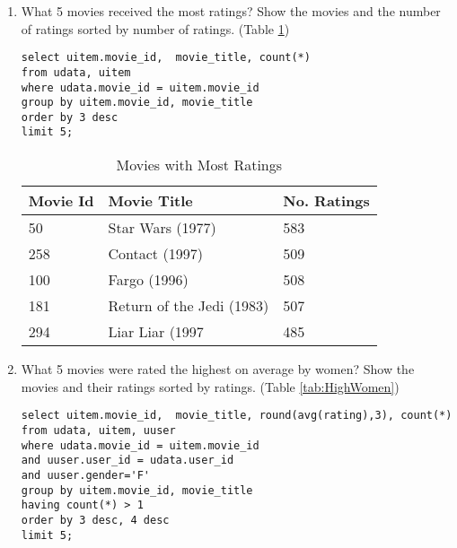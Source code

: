 \documentclass[letterpaper,11pt]{report}
\begin{document}
\begin{savenotes}
\begin{enumerate}
\item What 5 movies received the most ratings? Show the movies and the number of ratings sorted by number of ratings. (Table \ref{tab:MostRatings})

\begin{verbatim}
select uitem.movie_id,  movie_title, count(*) 
from udata, uitem 
where udata.movie_id = uitem.movie_id 
group by uitem.movie_id, movie_title 
order by 3 desc 
limit 5;
\end{verbatim}

\begin{table}[htbp]
\centering
    \begin{tabular}{|l|l|l|}
    \hline
    Movie Id & Movie Title               & No. Ratings \\ \hline
    50       & Star Wars (1977)          & 583         \\ \hline
    258      & Contact (1997)            & 509         \\ \hline
    100      & Fargo (1996)              & 508         \\ \hline
    181      & Return of the Jedi (1983) & 507         \\ \hline
    294      & Liar Liar (1997           & 485         \\ \hline
    \end{tabular}
    \caption {Movies with Most Ratings}
			\label{tab:MostRatings}
\end{table}


\item What 5 movies were rated the highest on average by women? Show the movies and their ratings sorted by ratings. (Table \ref{tab:HighWomen})

\begin{verbatim}
select uitem.movie_id,  movie_title, round(avg(rating),3), count(*) 
from udata, uitem, uuser 
where udata.movie_id = uitem.movie_id 
and uuser.user_id = udata.user_id 
and uuser.gender='F' 
group by uitem.movie_id, movie_title 
having count(*) > 1 
order by 3 desc, 4 desc 
limit 5;
\end{verbatim}


\end{enumerate}
\end{savenotes}
\end{document}
